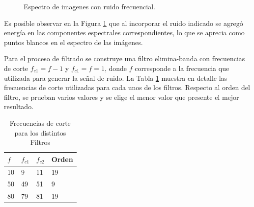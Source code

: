 \documentclass[
  letterpaper,
  twocolumn,
  9pt,
  journal,
  final]{IEEEtran}
\begin{document}
\begin{figure}[!tbh]
\begin{subfigure}[b]{.3\linewidth}
  \end{subfigure}

  \caption{Espectro de imagenes con ruido frecuencial.} \label{fig:fft_ruido_freq}
\end{figure}

Es posible observar en la Figura \ref{fig:fft_ruido_freq} que al incorporar el ruido indicado se agregó energía en las componentes espectrales correspondientes, lo que se aprecia como puntos blancos en el espectro de las imágenes.

Para el proceso de filtrado se construye una filtro elimina-banda con frecuencias de corte $f_{c1}
= f - 1$ y $f_{c1} = f = 1$, donde $f$ corresponde a la frecuencia que utilizada para generar la señal de ruido. La Tabla \ref{tab:fc} muestra en detalle las frecuencias de corte utilizadas para cada unos de los filtros. Respecto al orden del filtro, se prueban varios valores y se elige el menor valor que presente el mejor resultado.

\begin{table}[!tbh]
\centering
\caption{Frecuencias de corte para los distintos Filtros}
\label{tab:fc}
\begin{tabular}{l | l |l | l }
$f$  & $f_{c1}$ & $f_{c2}$  & Orden\\  \hline \hline
10 & 9   & 11 & 19 \\
50 & 49  & 51 &  9 \\
80 & 79  & 81 & 19 \\
\end{tabular}
\end{table}
\end{document}
